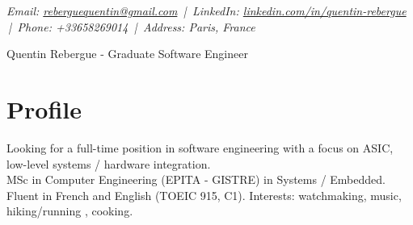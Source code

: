 \documentclass[9pt,a4paper]{article}
\newcommand{\namefont}{\fontsize{18}{22}\selectfont}
\newcommand{\tinyscript}{\fontsize{8}{8}\selectfont}
\begin{document}
\renewcommand\normalsize{\fontsize{10.5}{15}\selectfont}
\normalsize

\begin{center}
  {\tinyscript\itshape
  Email: \href{mailto:reberguequentin@gmail.com}{reberguequentin@gmail.com} \,|\,
  LinkedIn: \href{https://linkedin.com/in/quentin-rebergue}{linkedin.com/in/quentin-rebergue} \,|\,
  Phone: +33658269014 \,|\,
  Address: Paris, France}
\end{center}

\begin{center}
  {\namefont Quentin Rebergue - Graduate Software Engineer}
\end{center}

\section*{Profile}
\begin{tcolorbox}[mybox2]
Looking for a full-time position in software engineering with a focus on ASIC, low-level systems / hardware integration.\\[0.3em]
MSc in Computer Engineering (EPITA - GISTRE) in Systems / Embedded.\\[0.3em]
Fluent in French and English (TOEIC 915, C1). Interests: watchmaking, music, hiking/running , cooking.
\end{tcolorbox}
\end{document}
